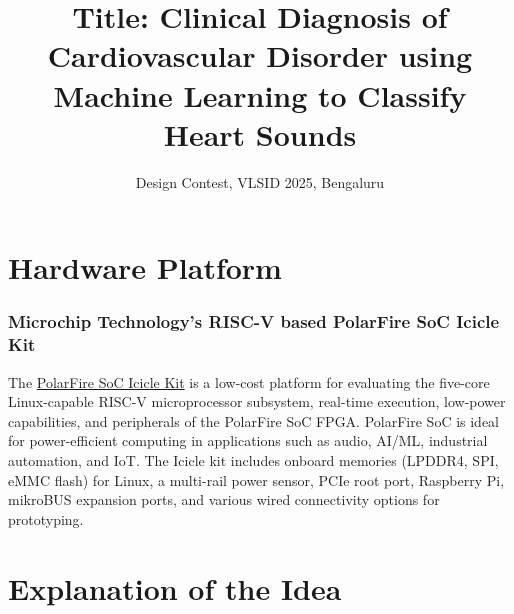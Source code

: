 \documentclass[12pt]{article}
\title{Title: Clinical Diagnosis of Cardiovascular Disorder using Machine Learning to Classify Heart Sounds }
\author{Design Contest, VLSID 2025, Bengaluru}
\begin{document}
\maketitle

\begin{abstract}

\end{abstract}

\section{Hardware Platform}

\subsubsection*{Microchip Technology’s RISC-V based PolarFire SoC Icicle Kit}

The \href{https://www.microchip.com/en-us/development-tool/mpfs-icicle-kit-es}{PolarFire SoC Icicle Kit} is a low-cost platform for evaluating the five-core Linux-capable RISC-V microprocessor subsystem, real-time execution, low-power capabilities, and peripherals of the PolarFire SoC FPGA. PolarFire SoC is ideal for power-efficient computing in applications such as audio, AI/ML, industrial automation, and IoT. The Icicle kit includes onboard memories (LPDDR4, SPI, eMMC flash) for Linux, a multi-rail power sensor, PCIe root port, Raspberry Pi, mikroBUS expansion ports, and various wired connectivity options for prototyping.


\section{Explanation of the Idea}
\end{document}
